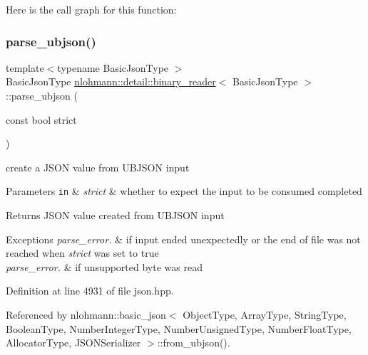 Here is the call graph for this function\+:
\mbox{\label{classnlohmann_1_1detail_1_1binary__reader_ad0be02d1df4ba4fbe601b0985f5300ac}} 
\subsubsection{\texorpdfstring{parse\+\_\+ubjson()}{parse\_ubjson()}}
{\footnotesize\ttfamily template$<$typename Basic\+Json\+Type $>$ \\
Basic\+Json\+Type \hyperlink{classnlohmann_1_1detail_1_1binary__reader}{nlohmann\+::detail\+::binary\+\_\+reader}$<$ Basic\+Json\+Type $>$\+::parse\+\_\+ubjson (\begin{DoxyParamCaption}\item[{const bool}]{strict }\end{DoxyParamCaption})\hspace{0.3cm}{\ttfamily [inline]}}



create a J\+S\+ON value from U\+B\+J\+S\+ON input 


\begin{DoxyParams}[1]{Parameters}
\mbox{\tt in}  & {\em strict} & whether to expect the input to be consumed completed \\
\hline
\end{DoxyParams}
\begin{DoxyReturn}{Returns}
J\+S\+ON value created from U\+B\+J\+S\+ON input
\end{DoxyReturn}

\begin{DoxyExceptions}{Exceptions}
{\em parse\+\_\+error.} & if input ended unexpectedly or the end of file was not reached when {\itshape strict} was set to true \\
\hline
{\em parse\+\_\+error.} & if unsupported byte was read \\
\hline
\end{DoxyExceptions}


Definition at line 4931 of file json.\+hpp.



Referenced by nlohmann\+::basic\+\_\+json$<$ Object\+Type, Array\+Type, String\+Type, Boolean\+Type, Number\+Integer\+Type, Number\+Unsigned\+Type, Number\+Float\+Type, Allocator\+Type, J\+S\+O\+N\+Serializer $>$\+::from\+\_\+ubjson().


